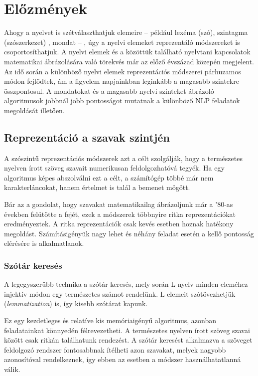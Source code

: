 \chapter{Előzmények}
\label{ch:related_work}

Ahogy a nyelvet is szétválaszthatjuk elemeire – például lexéma (szó), szintagma (szószerkezet) , mondat – , úgy a nyelvi elemeket reprezentáló módszereket is csoportosíthatjuk. A nyelvi elemek és a közöttük található nyelvtani kapcsolatok matematikai ábrázolására való törekvés már az előző évszázad közepén megjelent. Az idő során a különböző nyelvi elemek reprezentációs módszerei párhuzamos módon fejlődtek, ám a figyelem napjainkban leginkább a magasabb szintekre összpontosul. A mondatokat és a magasabb nyelvi szinteket ábrázoló algoritmusok jobbnál jobb pontosságot mutatnak a különböző NLP feladatok megoldását illetően.


\section{Reprezentáció a szavak szintjén}

A szószintű reprezentációs módszerek azt a célt szolgálják, hogy a természetes nyelven írott szöveg szavait numerikusan feldolgozhatóvá tegyék. Ha egy algoritmus képes abszolválni ezt a célt, a számítógép többé már nem karakterláncokat, hanem értelmet is talál a bemenet mögött.

Bár az a gondolat, hogy szavakat matematikailag ábrázoljunk már a '80-as években felütötte a fejét, ezek a módszerek többnyire ritka reprezentációkat eredményeztek. A ritka reprezentációk csak kevés esetben hoznak hatékony megoldást. Számításigényük nagy lehet és néhány feladat esetén a kellő pontosság elérésére is alkalmatlanok.

\subsection{Szótár keresés}

A legegyszerűbb technika a szótár keresés, mely során L nyelv minden eleméhez injektív módon egy természetes számot rendelünk. L elemeit szótövezhetjük (\textit{lemmatization}) is, így kisebb szótárat kapunk.

Ez egy kezdetleges és relatíve kis memóriaigényű algoritmus, azonban feladatainkat könnyedén félrevezetheti. A természetes nyelven írott szöveg szavai között csak ritkán találhatunk rendezést. A szótár keresést alkalmazva a szöveget feldolgozó rendszer fontosabbnak ítélheti  azon szavakat, melyek nagyobb azonosítóval rendelkeznek, így ebben az esetben a módszer használhatatlanná válik.

